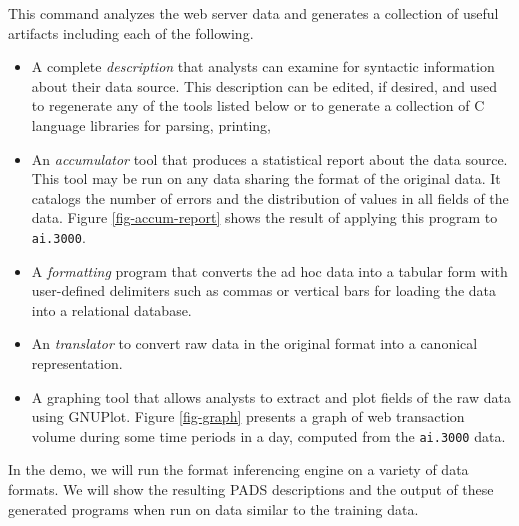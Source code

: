 \documentclass[preprint]{sig-alternate-sigmod08}
\begin{document}
\noindent
This command analyzes the web server data and generates a collection
of useful artifacts including each of the following.

\begin{itemize}
\item A complete {\em \pads{} description} that analysts can
examine for syntactic information about their data source.  This description 
can be edited, if desired, and used to regenerate any of the 
tools listed below or to generate a collection of C language libraries for 
parsing, printing, \etc
\item An {\em accumulator} tool
that produces a statistical report about the data source.  This
tool may be run on any data sharing the format of
the original data.  It catalogs the number of errors
and the distribution of values in all fields of the data.
Figure \ref{fig-accum-report} shows the result of applying this
program to {\tt ai.3000}.
\item A {\em formatting} program that converts
the ad hoc data into a tabular form with user-defined delimiters
such as commas or vertical bars for loading the data into a relational database.
\item An {\em \xml{} translator} to convert
raw data in the original format into a canonical \xml{} representation.  
\item A graphing tool that allows analysts to extract and plot fields
of the raw data using GNUPlot. Figure \ref{fig-graph} presents a graph of web
transaction volume during some time periods in a day, computed from
the {\tt ai.3000} data.
\end{itemize}
In the demo, we will run the format inferencing engine on a variety of
data formats.  We will show the resulting PADS descriptions and the
output of these generated programs when run on data similar to the
training data.
\end{document}
